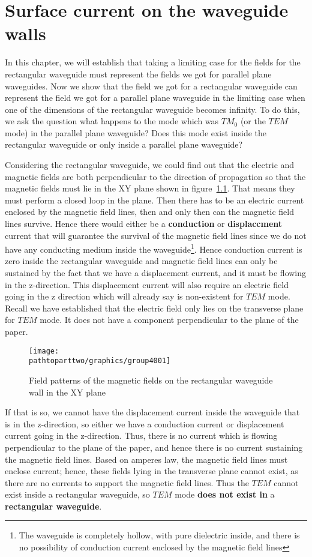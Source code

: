 \chapter{Surface current on the waveguide walls}
In this chapter, we will establish that taking a limiting case for the fields for the rectangular waveguide must represent the fields we got for parallel plane waveguides. Now we show that the field we got for a rectangular waveguide can represent the field we got for a parallel plane waveguide in the limiting case when one of the dimensions of the rectangular waveguide becomes infinity. To do this, we ask the question what happens to the mode which was $TM_0$ (or the $TEM$ mode) in the parallel plane waveguide? Does this mode exist inside the rectangular waveguide or only inside a parallel plane waveguide?

Considering the rectangular waveguide, we could find out that the electric and magnetic fields are both perpendicular to the direction of propagation so that the magnetic fields must lie in the XY plane shown in figure~\ref{fig:group4001}. That means they must perform a closed loop in the plane. Then there has to be an electric current enclosed by the magnetic field lines, then and only then can the magnetic field lines survive. Hence there would either be a \textbf{conduction} or \textbf{displaccment} current that will guarantee the survival of the magnetic field lines since we do not have any conducting medium inside the waveguide\footnote{The waveguide is completely hollow, with pure dielectric inside, and there is no possibility of conduction current enclosed by the magnetic field lines}. Hence conduction current is zero inside the rectangular waveguide and magnetic field lines can only be sustained by the fact that we have a displacement current, and it must be flowing in the z-direction. This displacement current will also require an electric field going in the z direction which will already say is non-existent for $TEM$ mode. Recall we have established that the electric field only lies on the transverse plane for $TEM$ mode. It does not have a component perpendicular to the plane of the paper.
\begin{figure}[h]
\centering
\texttt{[image: \\pathtoparttwo/graphics/group4001]}
\caption{Field patterns of the magnetic fields on the rectangular waveguide wall in the XY plane}
\label{fig:group4001}
\end{figure}

If that is so, we cannot have the displacement current inside the waveguide that is in the z-direction, so either we have a conduction current or displacement current going in the z-direction. Thus, there is no current which is flowing perpendicular to the plane of the paper, and hence there is no current sustaining the magnetic field lines. Based on amperes law, the magnetic field lines must enclose current; hence, these fields lying in the transverse plane cannot exist, as there are no currents to support the magnetic field lines. Thus the $TEM$ cannot exist inside a rectangular waveguide, so $TEM$ mode \textbf{does not exist in} a \textbf{rectangular waveguide}.

